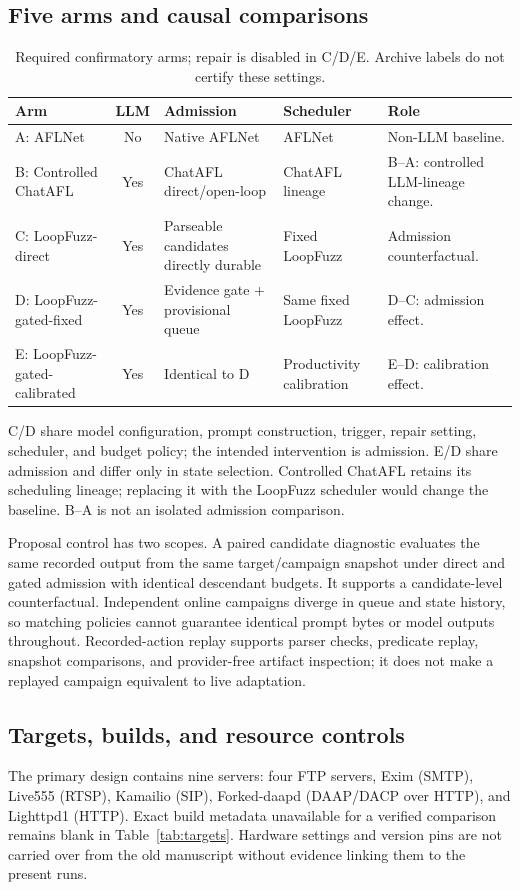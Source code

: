 \documentclass[final,5p,times,number]{elsarticle}
\begin{document}
\subsection{Five arms and causal comparisons}
\begin{table}[!tbp]
\centering\small
\caption{Required confirmatory arms; repair is disabled in C/D/E. Archive labels do not certify these settings.}
\label{tab:arms}
\begin{tabularx}{\textwidth}{l c Y Y Y}
\toprule
Arm & LLM & Admission & Scheduler & Role \\
\midrule
A: AFLNet & No & Native AFLNet & AFLNet & Non-LLM baseline. \\
B: Controlled ChatAFL & Yes & ChatAFL direct/open-loop & ChatAFL lineage & B--A: controlled LLM-lineage change. \\
C: LoopFuzz-direct & Yes & Parseable candidates directly durable & Fixed LoopFuzz & Admission counterfactual. \\
D: LoopFuzz-gated-fixed & Yes & Evidence gate + provisional queue & Same fixed LoopFuzz & D--C: admission effect. \\
E: LoopFuzz-gated-calibrated & Yes & Identical to D & Productivity calibration & E--D: calibration effect. \\
\bottomrule
\end{tabularx}
\end{table}

C/D share model configuration, prompt construction, trigger, repair setting, scheduler, and budget policy; the intended intervention is admission. E/D share admission and differ only in state selection. Controlled ChatAFL retains its scheduling lineage; replacing it with the LoopFuzz scheduler would change the baseline. B--A is not an isolated admission comparison.

Proposal control has two scopes. A paired candidate diagnostic evaluates the same recorded output from the same target/campaign snapshot under direct and gated admission with identical descendant budgets. It supports a candidate-level counterfactual. Independent online campaigns diverge in queue and state history, so matching policies cannot guarantee identical prompt bytes or model outputs throughout. Recorded-action replay supports parser checks, predicate replay, snapshot comparisons, and provider-free artifact inspection; it does not make a replayed campaign equivalent to live adaptation.

\subsection{Targets, builds, and resource controls}
The primary design contains nine servers: four FTP servers, Exim (SMTP), Live555 (RTSP), Kamailio (SIP), Forked-daapd (DAAP/DACP over HTTP), and Lighttpd1 (HTTP). Exact build metadata unavailable for a verified comparison remains blank in Table~\ref{tab:targets}. Hardware settings and version pins are not carried over from the old manuscript without evidence linking them to the present runs.
\end{document}
